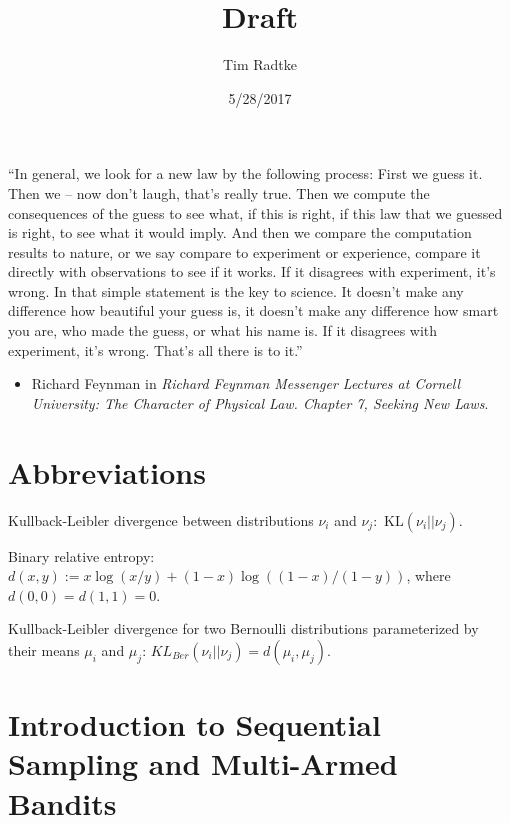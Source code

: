 \documentclass[12pt,]{article}
\title{Draft}
\author{Tim Radtke}
\date{5/28/2017}
\providecommand{\tightlist}{%
  \setlength{\itemsep}{0pt}\setlength{\parskip}{0pt}}
\newcommand{\KL}{\,\text{KL}}
\begin{document}
\maketitle

{
\hypersetup{linkcolor=black}
\setcounter{tocdepth}{2}
\tableofcontents
}
\newpage

``In general, we look for a new law by the following process: First we
guess it. Then we -- now don't laugh, that's really true. Then we
compute the consequences of the guess to see what, if this is right, if
this law that we guessed is right, to see what it would imply. And then
we compare the computation results to nature, or we say compare to
experiment or experience, compare it directly with observations to see
if it works. If it disagrees with experiment, it's wrong. In that simple
statement is the key to science. It doesn't make any difference how
beautiful your guess is, it doesn't make any difference how smart you
are, who made the guess, or what his name is. If it disagrees with
experiment, it's wrong. That's all there is to it.''

\begin{itemize}
\tightlist
\item
  Richard Feynman in \emph{Richard Feynman Messenger Lectures at Cornell
  University: The Character of Physical Law. Chapter 7, Seeking New
  Laws}.
\end{itemize}

\newpage

\section{Abbreviations}\label{abbreviations}

Kullback-Leibler divergence between distributions \(\nu_i\) and
\(\nu_j\): \(\KL(\nu_i||\nu_j)\).

Binary relative entropy:
\(d(x,y) := x \log(x/y) + (1-x) \log((1-x)/(1-y))\), where
\(d(0,0) = d(1,1) = 0\).

Kullback-Leibler divergence for two Bernoulli distributions
parameterized by their means \(\mu_i\) and \(\mu_j\):
\(KL_{Ber}(\nu_i||\nu_j) = d(\mu_i, \mu_j)\).

\newpage

\section{Introduction to Sequential Sampling and Multi-Armed
Bandits}\label{introduction-to-sequential-sampling-and-multi-armed-bandits}
\end{document}
